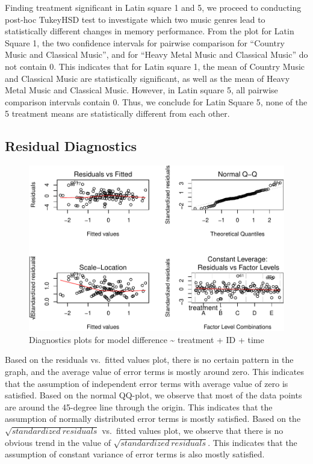 \documentclass[]{article}
\begin{document}
Finding treatment significant in Latin square 1 and 5, we proceed to
conducting post-hoc TukeyHSD test to investigate which two music genres
lead to statistically different changes in memory performance. From the
plot for Latin Square 1, the two confidence intervals for pairwise
comparison for ``Country Music and Classical Music'', and for ``Heavy
Metal Music and Classical Music'' do not contain 0. This indicates that
for Latin square 1, the mean of Country Music and Classical Music are
statistically significant, as well as the mean of Heavy Metal Music and
Classical Music. However, in Latin square 5, all pairwise comparison
intervals contain 0. Thus, we conclude for Latin Square 5, none of the 5
treatment means are statistically different from each other.

\subsection{Residual Diagnostics}\label{residual-diagnostics}

\begin{figure}
\centering
\includegraphics{STATS101B-Project-Code_files/figure-latex/unnamed-chunk-8-1.pdf}
\caption{Diagnostics plots for model difference \textasciitilde{}
treatment + ID + time}
\end{figure}

Based on the residuals vs.~fitted values plot, there is no certain
pattern in the graph, and the average value of error terms is mostly
around zero. This indicates that the assumption of independent error
terms with average value of zero is satisfied. Based on the normal
QQ-plot, we observe that most of the data points are around the
45-degree line through the origin. This indicates that the assumption of
normally distributed error terms is mostly satisfied. Based on the
\(\sqrt{standardized\ residuals}\) vs.~fitted values plot, we observe
that there is no obvious trend in the value of
\(\sqrt{standardized\ residuals}\). This indicates that the assumption
of constant variance of error terms is also mostly satisfied.
\end{document}
